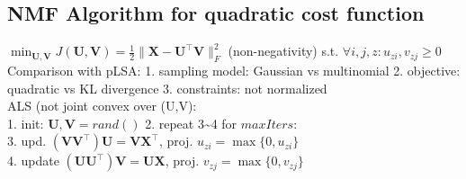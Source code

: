 \subsection*{NMF Algorithm for quadratic cost function}

$\min_{\mathbf{U}, \mathbf{V}} J(\mathbf{U}, \mathbf{V}) = \frac{1}{2} \|\mathbf{X} - \mathbf{U}^\top\mathbf{V}\|_F^2$ (non-negativity)
s.t. $\forall i,j,z:u_{zi},v_{zj} \geq 0 $ \\
Comparison with pLSA: 
1. sampling model: Gaussian vs multinomial
2. objective: quadratic vs KL divergence
3. constraints: not normalized \\
ALS (not joint convex over (U,V):\\
1. init: $\mathbf{U}, \mathbf{V} = rand()$ 2. repeat 3\textasciitilde4 for $\mathit{maxIters}$:\\
3. upd. $(\mathbf{VV}^\top)\mathbf{U} = \mathbf{VX}^\top$, proj. $u_{zi} = \max \{ 0, u_{zi} \}$\\
4. update $(\mathbf{UU}^\top)\mathbf{V} = \mathbf{UX}$, proj. $v_{zj} = \max \{ 0, v_{zj} \}$
